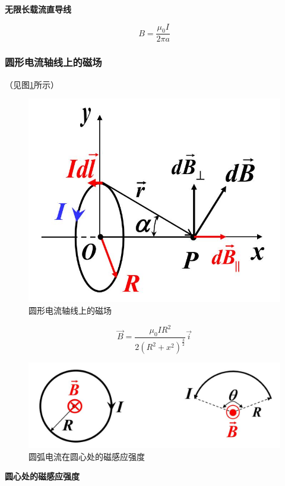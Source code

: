 \documentclass{ctexart}
\begin{document}
\textbf{无限长载流直导线}

$$B=\frac{\mu_0I}{2\pi a}$$

\subsubsection{圆形电流轴线上的磁场}

（见图\ref{figure12.2}所示）

\begin{figure}[h]
	\centering
	\includegraphics[scale=0.4]{images//chapter_12//figure_12.2.jpg} 
	\caption{圆形电流轴线上的磁场}\label{figure12.2}
\end{figure}

$$\vec{B}=\frac{\mu_0IR^2}{2(R^2+x^2)^{\frac{3}{2}}}\vec{i}$$

\begin{figure}[h]
	\centering
	\includegraphics[scale=0.4]{images//chapter_12//figure_12.3.jpg} 
	\caption{圆弧电流在圆心处的磁感应强度}\label{figure12.3}
\end{figure}

\textbf{圆心处的磁感应强度}
\end{document}
